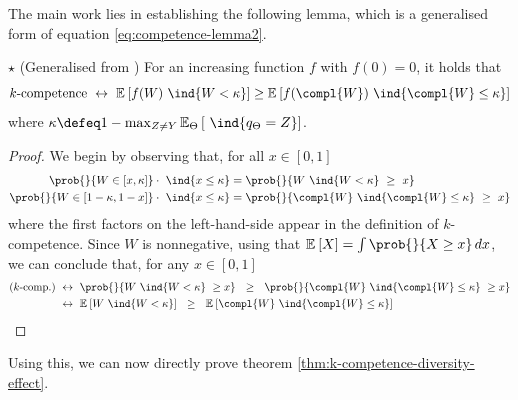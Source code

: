 \documentclass[../main.tex]{subfiles}
\begin{document}
The main work lies in establishing the following lemma, which is a generalised form of equation \ref{eq:competence-lemma2}. 

\begin{lemma} $\star$ (Generalised from \cite{theisen_WhenAreEnsembles_2023}) \label{thm:lemma-2} For an increasing function $f$ with $f(0)=0$, it holds that
$$
\text{$k$-competence}  ~\leftrightarrow~ \mathbb{E}_{}\left[ f(W) ~\ind{W < \kappa} \right] \geq \mathbb{E}_{}\left[ f(\compl{W}) ~\ind{\compl{W} \leq \kappa } \right]  
$$
where $ \kappa \defeq 1 - \max_{Z \not= Y} \mathbb{E}_{\Theta}\left[ ~\ind{q_{\Theta} = Z} \right]$.
\end{lemma}
\begin{proof}

We begin by observing that, for all $x \in [0,1]$
\begin{align*}
\prob{}{W \in [x, \kappa] } \cdot ~\ind{x \leq \kappa } &= \prob{}{W ~\ind{W < \kappa} ~ \geq ~ x} \\
\prob{}{W \in [1-\kappa,1-x]} \cdot ~\ind{x \leq \kappa} &= \prob{}{\compl{W} ~\ind{\compl{W} \leq \kappa } ~ \geq ~ x }
\end{align*}
where the first factors on the left-hand-side appear in the definition of $k$-competence.
Since $W$ is nonnegative, using that $\mathbb{E}_{}\left[ X \right] = \int \prob{}{X \geq x} \, dx$, we can conclude that, for any $x \in [0,1]$
\begin{align*}
\text{($k$-comp.)}  &~\leftrightarrow~  
\prob{}{W ~\ind{W < \kappa} ~ \geq x} 
~ ~ \geq ~ ~
\prob{}{\compl{W} ~\ind{\compl{W} \leq \kappa } ~ \geq x } \\
& ~\leftrightarrow~
\mathbb{E}_{}\left[ W ~\ind{W < \kappa} \right] ~ ~ \geq ~ ~ \mathbb{E}_{}\left[ \compl{W} ~\ind{\compl{W} \leq \kappa }  \right] 
\end{align*}
\end{proof}
Using this, we can now directly prove theorem \ref{thm:k-competence-diversity-effect}.
\end{document}
